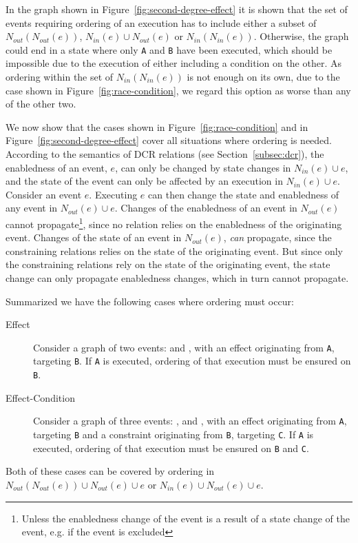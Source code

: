 \documentclass{article}
\begin{document}
	In the graph shown in Figure~\ref{fig:second-degree-effect} it is shown that the set of events requiring ordering of an execution has to include either a subset of $N_{out}(N_{out}(e))$, $N_{in}(e) \cup N_{out}(e)$ or $N_{in}(N_{in}(e))$.
	Otherwise, the graph could end in a state where only \texttt{A} and \texttt{B} have been executed, which should be impossible due to the execution of either including a condition on the other.
	As ordering within the set of $N_{in}(N_{in}(e))$ is not enough on its own, due to the case shown in Figure~\ref{fig:race-condition}, we regard this option as worse than any of the other two.

	We now show that the cases shown in Figure~\ref{fig:race-condition} and in Figure~\ref{fig:second-degree-effect} cover all situations where ordering is needed.
	According to the semantics of DCR relations (see Section~\ref{subsec:dcr}), the enabledness of an event, $e$, can only be changed by state changes in $N_{in}(e) \cup e$, and the state of the event can only be affected by an execution in $N_{in}(e) \cup e$.
	Consider an event $e$.
	Executing $e$ can then change the state and enabledness of any event in $N_{out}(e) \cup e$.
	Changes of the enabledness of an event in $N_{out}(e)$ cannot propagate\footnote{Unless the enabledness change of the event is a result of a state change of the event, e.g. if the event is excluded}, since no relation relies on the enabledness of the originating event.
	Changes of the state of an event in $N_{out}(e)$, \textit{can} propagate, since the constraining relations relies on the state of the originating event.
	But since only the constraining relations rely on the state of the originating event, the state change can only propagate enabledness changes, which in turn cannot propagate.

	Summarized we have the following cases where ordering must occur:
	\begin{description}
		\item[Effect] Consider a graph of two events:  and , with an effect originating from \texttt{A}, targeting \texttt{B}.
		If \texttt{A} is executed, ordering of that execution must be ensured on \texttt{B}.
		\item[Effect-Condition] Consider a graph of three events: ,  and , with an effect originating from \texttt{A}, targeting \texttt{B} and a constraint originating from \texttt{B}, targeting \texttt{C}.
		If \texttt{A} is executed, ordering of that execution must be ensured on \texttt{B} and \texttt{C}.
	\end{description}
	Both of these cases can be covered by ordering in $N_{out}(N_{out}(e)) \cup N_{out}(e) \cup e$ or $N_{in}(e) \cup N_{out}(e) \cup e$.
\end{document}
